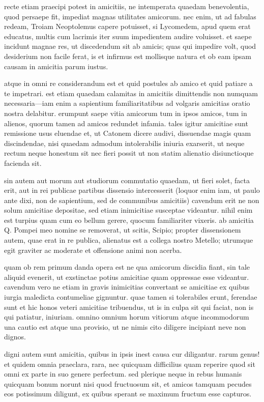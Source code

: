  recte etiam praecipi potest in amicitiis, ne intemperata quaedam benevolentia, quod persaepe fit, impediat magnas utilitates amicorum. nec enim, ut ad fabulas redeam, Troiam Neoptolemus capere potuisset, si Lycomedem, apud quem erat educatus, multis cum lacrimis iter suum impedientem audire voluisset. et saepe incidunt magnae res, ut discedendum sit ab amicis; quas qui impedire volt, quod desiderium non facile ferat, is et infirmus est mollisque natura et ob eam ipsam causam in amicitia parum iustus.

 atque in omni re considerandum est et quid postules ab amico et quid patiare a te impetrari. est etiam quaedam calamitas in amicitiis dimittendis non numquam necessaria—iam enim a sapientium familiaritatibus ad volgaris amicitias oratio nostra delabitur. erumpunt saepe vitia amicorum tum in ipsos amicos, tum in alienos, quorum tamen ad amicos redundet infamia. tales igitur amicitiae sunt remissione usus eluendae et, ut Catonem dicere audivi, dissuendae magis quam discindendae, nisi quaedam admodum intolerabilis iniuria exarserit, ut neque rectum neque honestum sit nec fieri possit ut non statim alienatio disiunctioque facienda sit.

 sin autem aut morum aut studiorum commutatio quaedam, ut fieri solet, facta erit, aut in rei publicae partibus dissensio intercesserit (loquor enim iam, ut paulo ante dixi, non de sapientium, sed de communibus amicitiis) cavendum erit ne non solum amicitiae depositae, sed etiam inimicitiae susceptae videantur. nihil enim est turpius quam cum eo bellum gerere, quocum familiariter vixeris. ab amicitia Q. Pompei meo nomine se removerat, ut scitis, Scipio; propter dissensionem autem, quae erat in re publica, alienatus est a collega nostro Metello; utrumque egit graviter ac moderate et offensione animi non acerba.

 quam ob rem primum danda opera est ne qua amicorum discidia fiant, sin tale aliquid evenerit, ut exstinctae potius amicitiae quam oppressae esse videantur. cavendum vero ne etiam in gravis inimicitias convertant se amicitiae ex quibus iurgia maledicta contumeliae gignuntur. quae tamen si tolerabiles erunt, ferendae sunt et hic honos veteri amicitiae tribuendus, ut is in culpa sit qui faciat, non is qui patiatur, iniuriam. omnino omnium horum vitiorum atque incommodorum una cautio est atque una provisio, ut ne nimis cito diligere incipiant neve non dignos.

 digni autem sunt amicitia, quibus in ipsis inest causa cur diligantur. rarum genus! et quidem omnia praeclara, rara, nec quicquam difficilius quam reperire quod sit omni ex parte in suo genere perfectum. sed plerique neque in rebus humanis quicquam bonum norunt nisi quod fructuosum sit, et amicos tamquam pecudes eos potissimum diligunt, ex quibus sperant se maximum fructum esse capturos.

